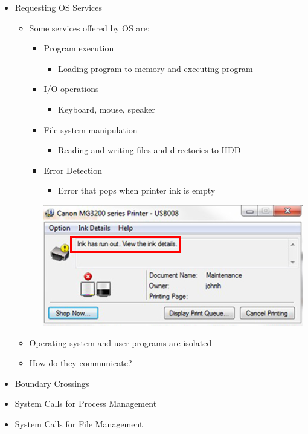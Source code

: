 \documentclass[12pt]{article}
\begin{document}
\begin{itemize}
    \item Requesting OS Services
    \begin{itemize}
        \item Some services offered by OS are:
        \begin{itemize}
            \item Program execution
            \begin{itemize}
                \item Loading program to memory and executing program
            \end{itemize}
            \item I/O operations
            \begin{itemize}
                \item Keyboard, mouse, speaker
            \end{itemize}
            \item File system manipulation
            \begin{itemize}
                \item Reading and writing files and directories to HDD
            \end{itemize}

            \item Error Detection
            \begin{itemize}
                \item Error that pops when printer ink is empty
            \end{itemize}

            \begin{center}
            \includegraphics[width=0.7\linewidth]{images/week_2_notes_1_5.png}
            \end{center}
        \end{itemize}

        \item Operating system and user programs are isolated

        \item How do they communicate?
    \end{itemize}
    \item Boundary Crossings
    \item System Calls for Process Management
    \item System Calls for File Management

\end{itemize}
\end{document}
